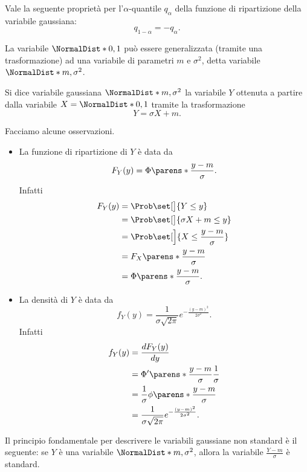 \begin{proposition}
    Vale la seguente proprietà per l'$\alpha$-quantile $q_\alpha$ della funzione di ripartizione della variabile gaussiana: \[
        q_{1-\alpha} = - q_{\alpha}.
    \]
\end{proposition}

La variabile $\NormalDist*{0, 1}$ può essere generalizzata (tramite una trasformazione) ad una variabile di parametri $m$ e $\sigma^2$, detta variabile $\NormalDist*{m, \sigma^2}$.

\begin{definition}
     Si dice variabile gaussiana $\NormalDist*{m, \sigma^2}$ la variabile $Y$ ottenuta a partire dalla variabile $X = \NormalDist*{0, 1}$ tramite la trasformazione \[
        Y = \sigma X + m.     
    \]
\end{definition}

Facciamo alcune osservazioni. \begin{itemize}
    \item La funzione di ripartizione di $Y$ è data da \[
        F_Y(y) = \Phi\parens*{\frac{y-m}{\sigma}}.    
    \] Infatti \begin{align*}
        F_Y(y) &= \Prob\set[\big]{Y \leq y} \\
        &= \Prob\set[\big]{\sigma X + m \leq y}\\
        &= \Prob\set[\Big]{X \leq \frac{y-m}{\sigma}}\\
        &= F_X\parens*{\frac{y-m}{\sigma}}\\
        &= \Phi\parens*{\frac{y-m}{\sigma}}.
    \end{align*}
    \item La densità di $Y$ è data da \[
        f_Y(y) = \frac{1}{\sigma\sqrt{2\pi}} e^{-\frac{(y-m)^2}{2\sigma^2}}.
    \] Infatti \begin{align*}
        f_Y(y) &= \frac{dF_Y(y)}{dy}\\
        &= \Phi^\prime\parens*{\frac{y-m}{\sigma}}\frac{1}{\sigma}\\
        &= \frac{1}{\sigma}\phi\parens*{\frac{y-m}{\sigma}}\\
        &= \frac{1}{\sigma\sqrt{2\pi}} e^{-\frac{(y-m)^2}{2\sigma^2}}.
    \end{align*}
\end{itemize}

Il principio fondamentale per descrivere le variabili gaussiane non standard è il seguente: se $Y$ è una variabile $\NormalDist*{m, \sigma^2}$, allora la variabile $\frac{Y-m}{\sigma}$ è standard.

